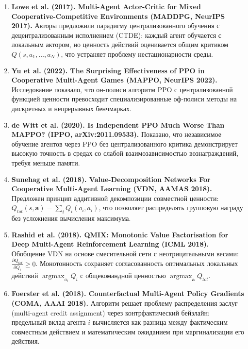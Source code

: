 \documentclass[11pt,a4paper]{article}
\begin{document}
\begin{enumerate}[leftmargin=*]
\item \textbf{Lowe et al. (2017). Multi-Agent Actor-Critic for Mixed Cooperative-Competitive Environments (MADDPG, NeurIPS 2017).} Авторы предложили парадигму централизованного обучения с децентрализованным исполнением (CTDE): каждый агент обучается с локальным актором, но ценность действий оценивается общим критиком $Q(s, a_1, \dots, a_N)$, что устраняет проблему нестационарности среды.

\item \textbf{Yu et al. (2022). The Surprising Effectiveness of PPO in Cooperative Multi-Agent Games (MAPPO, NeurIPS 2022).} Исследование показало, что он-полиси алгоритм PPO с централизованной функцией ценности превосходит специализированные оф-полиси методы на дискретных и непрерывных бенчмарках.

\item \textbf{de Witt et al. (2020). Is Independent PPO Much Worse Than MAPPO? (IPPO, arXiv:2011.09533).} Показано, что независимое обучение агентов через PPO без централизованного критика демонстрирует высокую точность в средах со слабой взаимозависимостью вознаграждений, требуя меньше памяти.

\item \textbf{Sunehag et al. (2018). Value-Decomposition Networks For Cooperative Multi-Agent Learning (VDN, AAMAS 2018).} Предложен принцип аддитивной декомпозиции совместной ценности: $Q_{tot}(s, \mathbf{a}) = \sum_i Q_i(o_i, a_i)$, что позволяет распределять групповую награду без усложнения вычисления максимума.

\item \textbf{Rashid et al. (2018). QMIX: Monotonic Value Factorisation for Deep Multi-Agent Reinforcement Learning (ICML 2018).} Обобщение VDN на основе смесительной сети с неотрицательными весами: $\frac{\partial Q_{tot}}{\partial Q_i} \ge 0$. Монотонность сохраняет согласованность оптимальных локальных действий $\operatorname{argmax}_{a_i} Q_i$ с общекомандной ценностью $\operatorname{argmax}_{\mathbf{a}} Q_{tot}$.

\item \textbf{Foerster et al. (2018). Counterfactual Multi-Agent Policy Gradients (COMA, AAAI 2018).} Алгоритм решает проблему распределения заслуг (multi-agent credit assignment) через контрфактический бейзлайн: предельный вклад агента $i$ вычисляется как разница между фактическим совместным действием и математическим ожиданием при маргинализации его действия.


\end{enumerate}
\end{document}

